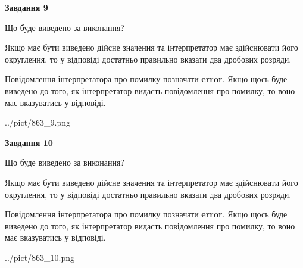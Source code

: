 \documentclass[12pt, ukrainian]{article}
\begin{document}
{\begin {Large}
{\begin {center}\textbf{Завдання 9}\end {center}}\par
Що буде виведено за виконання? \par

Якщо має бути виведено дійсне значення та інтерпретатор має здійснювати його округлення, 
то у відповіді достатньо правильно вказати два дробових розряди.

Повідомлення інтерпретатора про помилку позначати \textbf{error}.
Якщо щось буде виведено до того, як інтерпретатор видасть повідомлення про помилку, 
то воно має вказуватись у відповіді. \par

\begin{center}
	{../pict/863_9.png}
\end{center}
\newpage

{\begin {center}\textbf{Завдання 10}\end {center}}\par
Що буде виведено за виконання? \par

Якщо має бути виведено дійсне значення та інтерпретатор має здійснювати його округлення, 
то у відповіді достатньо правильно вказати два дробових розряди.

Повідомлення інтерпретатора про помилку позначати \textbf{error}.
Якщо щось буде виведено до того, як інтерпретатор видасть повідомлення про помилку, 
то воно має вказуватись у відповіді. \par

\begin{center}
	{../pict/863_10.png}
\end{center}
\newpage

\end {Large}}
\end{document}
